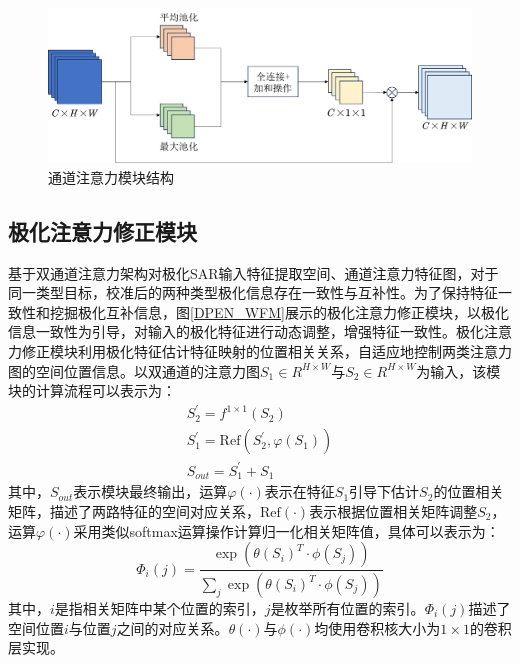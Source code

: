 \begin{figure}[ht!]
    \centering
    \includegraphics[width=14cm]{pic/chapter3/Channel.png}
    \caption{通道注意力模块结构}
    \label{fig:channel}
\end{figure}


\subsection{极化注意力修正模块}
\label{sec:极化注意力修正模块}

基于双通道注意力架构对极化SAR输入特征提取空间、通道注意力特征图，对于同一类型目标，校准后的两种类型极化信息存在一致性与互补性。为了保持特征一致性和挖掘极化互补信息，图\ref{DPEN_WFM}展示的极化注意力修正模块，以极化信息一致性为引导，对输入的极化特征进行动态调整，增强特征一致性。极化注意力修正模块利用极化特征估计特征映射的位置相关关系，自适应地控制两类注意力图的空间位置信息。以双通道的注意力图$S_1\in R^{H \times W}$与$S_2\in R^{H \times W}$为输入，该模块的计算流程可以表示为：
\begin{gather}
    S_{2}^{\prime}=f^{1\times 1}\left( S_2 \right)
    \\
    S_{1}^{\prime}=\mathrm{Ref}\left( S_{2}^{\prime},\varphi \left( S_1 \right) \right)
    \\
    S_{out}=S_{1}^{\prime}+S_1
\end{gather}
其中，$S_{out}$表示模块最终输出，运算$\varphi(\cdot)$表示在特征$S_1$引导下估计$S_2$的位置相关矩阵，描述了两路特征的空间对应关系，$\mathrm{Ref}(\cdot)$表示根据位置相关矩阵调整$S_{2}$，运算$\varphi(\cdot)$采用类似softmax运算操作计算归一化相关矩阵值，具体可以表示为：
\begin{equation}
    \Phi _i\left( j \right) =\frac{\exp \left( \theta \left( S_i \right) ^T\cdot \phi \left( S_j \right) \right)}{\sum_j{\exp \left( \theta \left( S_i \right) ^T\cdot \phi \left( S_j \right) \right)}}
\end{equation}
其中，$i$是指相关矩阵中某个位置的索引，$j$是枚举所有位置的索引。$\Phi_i(j)$描述了空间位置$i$与位置$j$之间的对应关系。$\theta(\cdot)$与$\phi(\cdot)$均使用卷积核大小为$1\times 1$的卷积层实现。

